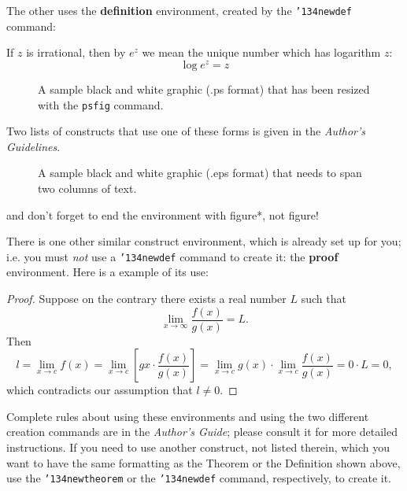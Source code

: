 \documentclass{acm_proc_article-sp}
\begin{document}
The other uses the \textbf{definition} environment, created
by the \texttt{{\char'134}newdef} command:
\begin{definition}
If $z$ is irrational, then by $e^z$ we mean the
unique number which has
logarithm $z$: \begin{displaymath}{\log e^z = z}\end{displaymath}
\end{definition}

\begin{figure}
\centering
{}
\caption{A sample black and white graphic (.ps format) that has
been resized with the \texttt{psfig} command.}
\end{figure}

Two lists of constructs that use one of these
forms is given in the
\textit{Author's  Guidelines}.

\begin{figure*}
\centering
{}
\caption{A sample black and white graphic (.eps format)
that needs to span two columns of text.}
\end{figure*}
and don't forget to end the environment with
{figure*}, not {figure}!
 
There is one other similar construct environment, which is
already set up
for you; i.e. you must \textit{not} use
a \texttt{{\char'134}newdef} command to
create it: the \textbf{proof} environment.  Here
is a example of its use:
\begin{proof}
Suppose on the contrary there exists a real number $L$ such that
\begin{displaymath}
\lim_{x\rightarrow\infty} \frac{f(x)}{g(x)} = L.
\end{displaymath}
Then
\begin{displaymath}
l=\lim_{x\rightarrow c} f(x)
= \lim_{x\rightarrow c}
\left[ g{x} \cdot \frac{f(x)}{g(x)} \right ]
= \lim_{x\rightarrow c} g(x) \cdot \lim_{x\rightarrow c}
\frac{f(x)}{g(x)} = 0\cdot L = 0,
\end{displaymath}
which contradicts our assumption that $l\neq 0$.
\end{proof}

Complete rules about using these environments and using the
two different creation commands are in the
\textit{Author's Guide}; please consult it for more
detailed instructions.  If you need to use another construct,
not listed therein, which you want to have the same
formatting as the Theorem
or the Definition\cite{salas:calculus} shown above,
use the \texttt{{\char'134}newtheorem} or the
\texttt{{\char'134}newdef} command,
respectively, to create it.
\end{document}
